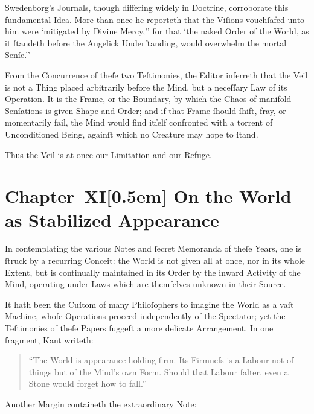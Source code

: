 \documentclass[12pt]{book}
\begin{document}
Swedenborg’s Journals, though differing widely in Doctrine, corroborate this fundamental Idea. More than once he reporteth that the Viſions vouchſafed unto him were `mitigated by Divine Mercy,'' for that `the naked Order of the World, as it ſtandeth before the Angelick Underſtanding, would overwhelm the mortal Senſe.''

From the Concurrence of theſe two Teſtimonies, the Editor inferreth that the Veil is not a Thing placed arbitrarily before the Mind, but a neceſſary Law of its Operation. It is the Frame, or the Boundary, by which the Chaos of manifold Senſations is given Shape and Order; and if that Frame ſhould ſhift, fray, or momentarily fail, the Mind would find itſelf confronted with a torrent of Unconditioned Being, againſt which no Creature may hope to ſtand.

Thus the Veil is at once our Limitation and our Refuge.


\chapter*{Chapter~XI[0.5em]
On the World as Stabilized Appearance}


In contemplating the various Notes and ſecret Memoranda of theſe Years, one is ſtruck by a recurring Conceit: the World is not given all at once, nor in its whole Extent, but is continually maintained in its Order by the inward Activity of the Mind, operating under Laws which are themſelves unknown in their Source.

It hath been the Cuſtom of many Philoſophers to imagine the World as a vaſt Machine, whoſe Operations proceed independently of the Spectator; yet the Teſtimonies of theſe Papers ſuggeſt a more delicate Arrangement. In one fragment, Kant writeth:

\begin{quote}
``The World is appearance holding firm. Its Firmneſs is a Labour not of things but of the Mind's own Form. Should that Labour falter, even a Stone would forget how to fall.’’
\end{quote}

Another Margin containeth the extraordinary Note:
\end{document}
